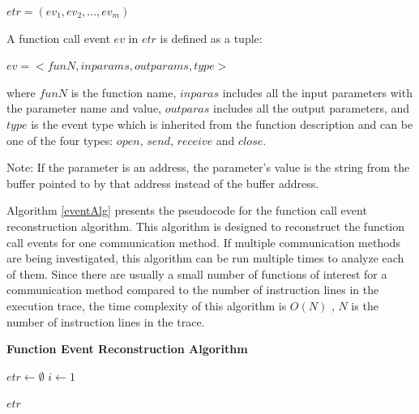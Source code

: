 $etr = (ev_1, ev_2, ..., ev_m)$

A function call event $ev$ in $etr$ is defined as a tuple:

$ev = <funN, inparams, outparams, type>$

where $funN$ is the function name, $inparas$ includes all the input parameters with the parameter name and value, $outparas$ includes all the output parameters, and $type$ is the event type which is inherited from the function description and can be one of the four types: $open$, $send$, $receive$ and $close$.


Note: If the parameter is an address, the parameter's value is the string from the buffer pointed to by that address instead of the buffer address.

Algorithm \ref{eventAlg} presents the pseudocode for the function call event reconstruction algorithm. This algorithm is designed to reconstruct the function call events for one communication method. If multiple communication methods are being investigated, this algorithm can be run multiple times to analyze each of them. Since there are usually a small number of functions of interest for a communication method compared to the number of instruction lines in the execution trace, the time complexity of this algorithm is $O(N)$ , $N$ is the number of instruction lines in the trace.

\begin{algorithm}[H]
\DontPrintSemicolon
\caption{{\bf Function Event Reconstruction Algorithm} \label{eventAlg}}
$etr \leftarrow \emptyset$\; 
$i \leftarrow 1$\;

\KwRet $etr$\;
\end{algorithm} 

